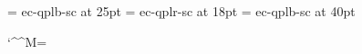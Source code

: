 


\def\TextFontName{pplr8r } %
\def\RefFontName{pplb8r }
\def\AnnotationFontName{pplb8r }
\font\TitleFont = ec-qplb-sc at 25pt
\font\AuthorFont = ec-qplr-sc at 18pt
\font\InitialFont = ec-qplb-sc at 40pt
\NormalFonts
\TextFont

\NoChords

\bgroup
\catcode`\^^M=\active
\gdef\bsong@1@2@3{
	\penalty-9000
	\begingroup
	\line{\AuthorFont @1: @3 (@2)\hss}%
	\vskip\baselineskip
	\global\VerseCounter = 0
	\verse
	\PrintAnnotationtrue
	\AnnotatedVersefalse
	\ForceVerseSeparatorfalse
	\DoTranspositionfalse
	\DefaultChordStyle
	\NormalFonts
	\TextFont
	\cmyk{\TextColor}%
	\def\ {\hskip1em}
	\everypar={\HandleLine}%
	\catcode`\^^M=\active%
	\gdef\HandleLine@@1^^M{\ProcessLine{@@1}\TextLineEnd}%
	\let^^M=\OtherLineEnd%
}
\egroup

\def\esong{%
	\everypar={}%
	\ifAnnotatedVerse
		\ProcessLine{}%
	\fi
	\endgroup
	\vskip2\baselineskip
}
